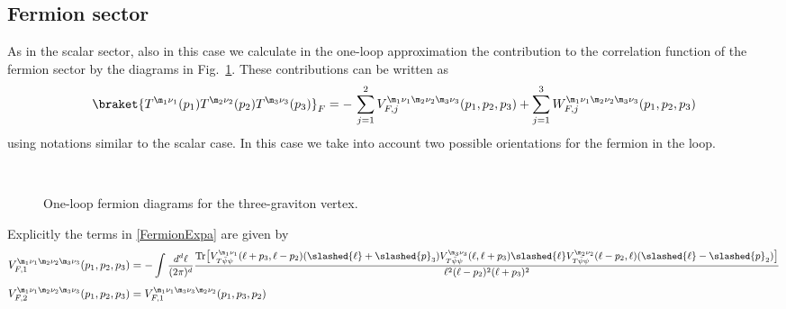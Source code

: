 \documentclass[a4paper,11pt,openright,twoside]{book}
\let\n=\nu      \let\x=\xi     \let\p=\pi      \let\r=\rho
\newcommand{\sdfrac}[2]{\mbox{\small$\displaystyle\frac{#1}{#2}$}}
\newcommand{\figref}[1]{Fig.~\ref{#1}}			%
\newcommand{\Tr}{\text{Tr}}
\numberwithin{equation}{section}
\begin{document}
{{%
\subsection{Fermion sector}
As in the scalar sector, also in this case we calculate in the one-loop approximation the contribution to the correlation function of the fermion sector by the diagrams in \figref{Feynman2}. These contributions can be written as 
\begin{align}
	\braket{T^{\m_1\n_1}(p_1)T^{\m_2\n_2}(p_2)T^{\m_3\n_3}(p_3)}_F=-\, \sum_{j=1}^2V_{F,j}^{\m_1\n_1\m_2\n_2\m_3\n_3}(p_1,p_2,p_3)+\sum_{j=1}^3W_{F,j}^{\m_1\n_1\m_2\n_2\m_3\n_3}(p_1,p_2,p_3)\label{FermionExpa}
\end{align}
using notations similar to the scalar case. In this case we take into account two possible orientations for the fermion in the loop. 
\begin{figure}[t]
	\centering
	\vspace{-2cm}
	 \hspace{.3cm}
	 \hspace{.3cm}
	 \hspace{.3cm}\\
	\vspace{-2.5cm}
	\vspace{-0.8cm}\caption{One-loop fermion diagrams for the three-graviton vertex.\label{Feynman2}}
\end{figure}
Explicitly the terms in \eqref{FermionExpa} are given by
\begin{align}
	V_{F,1}^{\m_1\n_1\m_2\n_2\m_3\n_3}(p_1,p_2,p_3)&=-\int \sdfrac{d^d\ell}{(2\pi)^d}\sdfrac{\Tr\big[V^{\m_1\n_1}_{T\bar\psi\psi}(\ell+p_3,\ell-p_2)(\slashed{\ell}+\slashed{p}_3)V^{\m_3\n_3}_{T\bar\psi\psi}(\ell,\ell+p_3)\slashed{\ell}V^{\m_2\n_2}_{T\bar\psi\psi}(\ell-p_2,\ell)(\slashed{\ell}-\slashed{p}_2)\big]}{\ell^2(\ell-p_2)^2(\ell+p_3)^2}\\[1ex]
	V_{F,2}^{\m_1\n_1\m_2\n_2\m_3\n_3}(p_1,p_2,p_3)&=V_{F,1}^{\m_1\n_1\m_3\n_3\m_2\n_2}(p_1,p_3,p_2)\\

\end{align}}}
\end{document}
